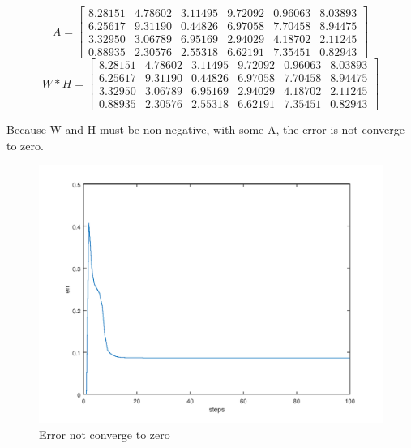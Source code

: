 \documentclass[a4paper, 11pt]{article}
\begin{document}
$$
A =
\begin{bmatrix}
	8.28151 &  4.78602 &  3.11495 &  9.72092 &  0.96063 &  8.03893 \\
   6.25617  &  9.31190 &  0.44826 &  6.97058 &  7.70458 &  8.94475 \\
   3.32950  &  3.06789 &  6.95169 &  2.94029 &  4.18702 &  2.11245 \\
   0.88935  &  2.30576 &  2.55318 &  6.62191 &  7.35451 &  0.82943
\end{bmatrix}
$$
$$
W * H =
\begin{bmatrix}
	8.28151 &  4.78602 &  3.11495 &  9.72092 &  0.96063 &  8.03893 \\
   6.25617  &  9.31190 &  0.44826 &  6.97058 &  7.70458 &  8.94475 \\
   3.32950  &  3.06789 &  6.95169 &  2.94029 &  4.18702 &  2.11245 \\
   0.88935  &  2.30576 &  2.55318 &  6.62191 &  7.35451 &  0.82943
\end{bmatrix}
$$
   
Because W and H must be non-negative, with some A, the error is not converge to zero.
\begin{figure}[htbp]
\centering
	\includegraphics[scale=0.6]{figure/p1_err.png}
	\caption{Error not converge to zero}
	\label{fig2}
\end{figure}
\end{document}
